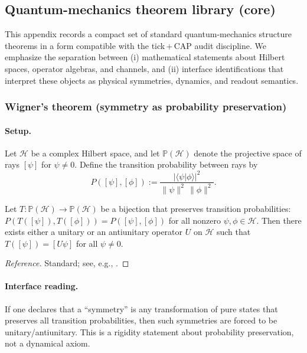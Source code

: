 \subsection{Quantum-mechanics theorem library (core)}
\label{app:qm_theorem_library_core}

This appendix records a compact set of standard quantum-mechanics structure theorems in a form compatible with the tick\,+\,CAP audit discipline.
We emphasize the separation between (i) mathematical statements about Hilbert spaces, operator algebras, and channels, and (ii) interface identifications that interpret these objects as physical symmetries, dynamics, and readout semantics.

\subsubsection{Wigner's theorem (symmetry as probability preservation)}
\paragraph{Setup.}
Let $\mathcal{H}$ be a complex Hilbert space, and let $\mathbb{P}(\mathcal{H})$ denote the projective space of rays $[\psi]$ for $\psi\ne 0$.
Define the transition probability between rays by
\[
P([\psi],[\phi]) := \frac{|\langle \psi|\phi\rangle|^2}{\|\psi\|^2\,\|\phi\|^2}.
\]

\begin{theorem}
\label{thm:z128_wigner}
Let $T:\mathbb{P}(\mathcal{H})\to \mathbb{P}(\mathcal{H})$ be a bijection that preserves transition probabilities:
$P(T([\psi]),T([\phi]))=P([\psi],[\phi])$ for all nonzero $\psi,\phi\in\mathcal{H}$.
Then there exists either a unitary or an antiunitary operator $U$ on $\mathcal{H}$ such that
$T([\psi])=[U\psi]$ for all $\psi\ne 0$.
\end{theorem}
\begin{proof}[Reference]
Standard; see, e.g., \cite{Wigner1931}.
\end{proof}

\paragraph{Interface reading.}
\InterfaceTag If one declares that a ``symmetry'' is any transformation of pure states that preserves all transition probabilities, then such symmetries are forced to be unitary/antiunitary.
This is a rigidity statement about probability preservation, not a dynamical axiom.

